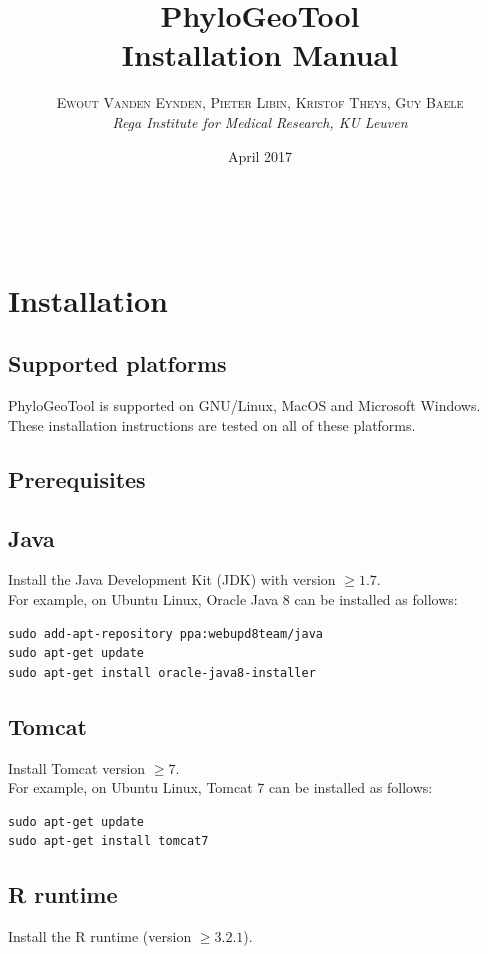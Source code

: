 \documentclass[a4paper, 11pt]{article} %
\title{\textbf{PhyloGeoTool}\\ %
Installation Manual} %
\author{\textsc{Ewout Vanden Eynden, Pieter Libin, Kristof Theys, Guy Baele} %
\\{\textit{Rega Institute for Medical Research, KU Leuven}}} %
\date{April 2017} %
\makeatletter
\renewcommand{\maketitle}{ %
\begin{flushright} %
{\LARGE\@title} %

\vspace{50pt} %

{\large\@author} %
\\\@date %

\vspace{40pt} %
\end{flushright}
}
\makeatother
\begin{document}
\maketitle %

\vspace{30pt} %

\tableofcontents
\newpage

\section{Installation}

\subsection{Supported platforms}
PhyloGeoTool is supported on GNU/Linux, MacOS and Microsoft Windows. These installation instructions are tested on all of these platforms.

\subsection{Prerequisites}
\subsection*{Java}
Install the Java Development Kit (JDK) with version $\geq 1.7$.\\

\noindent For example, on Ubuntu Linux, Oracle Java 8 can be installed as follows:
\begin{verbatim} 
sudo add-apt-repository ppa:webupd8team/java
sudo apt-get update
sudo apt-get install oracle-java8-installer
\end{verbatim}

\subsection*{Tomcat}
Install Tomcat version $\geq 7$.\\

\noindent For example, on Ubuntu Linux, Tomcat 7 can be installed as follows:
\begin{verbatim}
sudo apt-get update
sudo apt-get install tomcat7
\end{verbatim}

\subsection*{R runtime}
Install the R runtime (version $\geq 3.2.1$).\\
\end{document}
